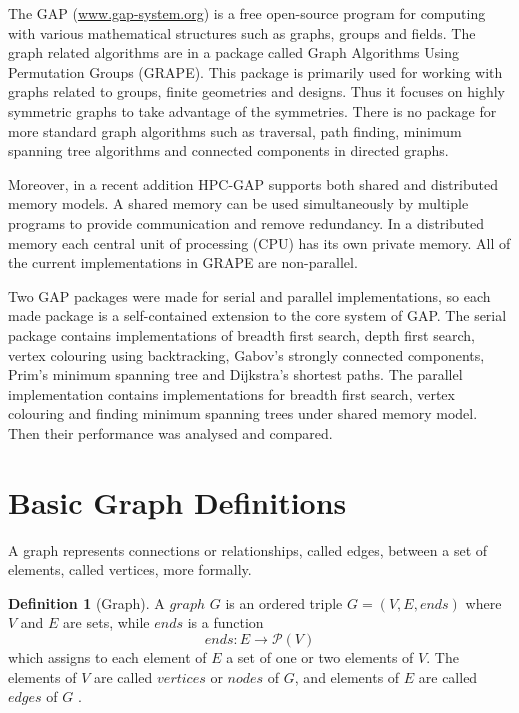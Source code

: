 \documentclass{report}
\theoremstyle{plain}
\theoremstyle{definition}
\newtheorem{definition}{Definition}
\theoremstyle{remark}
\numberwithin{definition}{chapter}
\numberwithin{example}{chapter}
\numberwithin{figure}{chapter}
\begin{document}
The GAP (\url{www.gap-system.org}) is a free open-source program for computing with various mathematical structures such as graphs, groups and fields. The graph related algorithms are in a package called Graph Algorithms Using Permutation Groups (GRAPE). This package is primarily used for working with graphs related to groups, finite geometries and designs. Thus it focuses on highly symmetric graphs to take advantage of the symmetries. There is no package for more standard graph algorithms such as traversal, path finding, minimum spanning tree algorithms and connected components in directed graphs.

Moreover, in a recent addition HPC-GAP supports both shared and distributed memory models. A shared memory can be used simultaneously by multiple programs to provide communication and remove redundancy. In a distributed memory each central unit of processing (CPU) has its own private memory. All of the current implementations in GRAPE are non-parallel.

Two GAP packages were made for serial and parallel implementations, so each made package is a self-contained extension to the core system of GAP. The serial package contains implementations of breadth first search, depth first search, vertex colouring using backtracking, Gabov's strongly connected components, Prim's minimum spanning tree and Dijkstra's shortest paths. The parallel implementation contains implementations for breadth first search, vertex colouring and finding minimum spanning trees under shared memory model. Then their performance was analysed and compared.

\section{Basic Graph Definitions}

A graph represents connections or relationships, called edges, between a set of elements, called vertices, more formally.

\begin{definition}[Graph]
A $graph$  $G$ is an ordered triple $G = (V, E, ends)$ where $V$ and $E$ are sets, while $ends$ is a function 
  \begin{equation}
  ends:E\to \mathcal P \left({V}\right)
  \end{equation}
which assigns to each element of $E$ a set of one or two elements of $V$. The elements of $V$ are called $vertices$ or $nodes$ of $G$, and elements of $E$ are called $edges$ of $G$ \cite{bondy2008graph}.
\end{definition}
\end{document}
